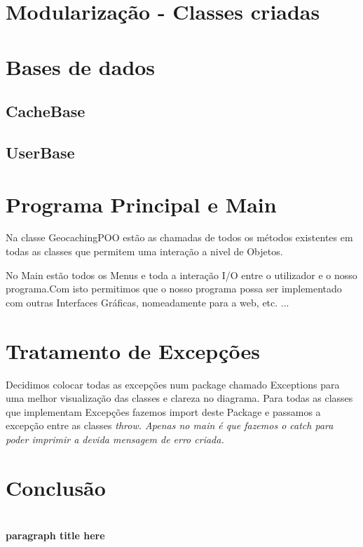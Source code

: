 \documentclass[a4paper,12pt]{article}
\begin{document}
\pagebreak


\section{Modularização - Classes criadas}


\pagebreak
\section{Bases de dados}

\subsection{CacheBase}
\subsection{UserBase}


\pagebreak
\section{Programa Principal e Main}
\quad Na classe GeocachingPOO estão as chamadas de todos os métodos existentes em todas as classes que permitem uma interação a nivel de Objetos.

\par No Main estão todos os Menus e toda a interação I/O entre o utilizador e o nosso programa.Com isto permitimos que o nosso programa possa ser implementado com outras Interfaces Gráficas, nomeadamente para a web, etc. ... 

\pagebreak
\section{Tratamento de Excepções}
\quad Decidimos colocar todas as excepções num package chamado Exceptions para uma melhor visualização das classes e clareza no diagrama.
Para todas as classes que implementam Excepções 
fazemos import deste Package e passamos a excepção entre as classes \em throw. Apenas no main é que fazemos o \em catch para poder imprimir a devida mensagem de erro criada.

\pagebreak
\section{Conclusão}



\pagebreak
\section{}
\subsection{}
\subsubsection{}

\paragraph{paragraph title here}
\end{document}
